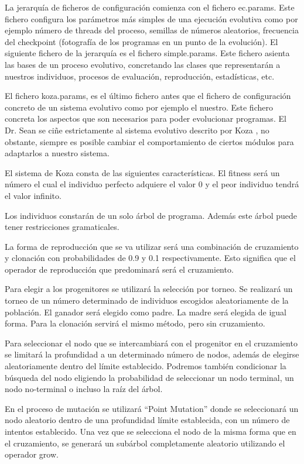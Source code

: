 La jerarquía de ficheros de configuración comienza con el fichero ec.params. Este
fichero configura los parámetros más simples de una ejecución evolutiva como por
ejemplo número de threads del proceso, semillas de números aleatorios, frecuencia
del checkpoint (fotografía de los programas en un punto de la evolución). El
siguiente fichero de la jerarquía es el fichero simple.params. Este fichero
asienta las bases de un proceso evolutivo, concretando las clases que
representarán a nuestros individuos, procesos de evaluación, reproducción,
estadísticas, etc.

El fichero koza.params, es el último fichero antes que el fichero de
configuración concreto de un sistema evolutivo como por ejemplo el nuestro. Este
fichero concreta los aspectos que son necesarios para poder evolucionar
programas. El Dr. Sean se ciñe estrictamente al sistema evolutivo descrito por
Koza \cite{Koza:1992}, no obstante, siempre es posible cambiar el
comportamiento de ciertos módulos para adaptarlos a nuestro sistema.

El sistema de Koza consta de las siguientes características. El fitness será un
número el cual el individuo perfecto adquiere el valor 0 y el peor individuo
tendrá el valor infinito.

Los individuos constarán de un solo árbol de programa. Además este árbol puede
tener restricciones gramaticales.

La forma de reproducción que se va utilizar será una combinación de cruzamiento y
clonación con probabilidades de 0.9 y 0.1 respectivamente. Esto significa que el
operador de reproducción que predominará será el cruzamiento.

Para elegir a los progenitores se utilizará la selección por torneo. Se realizará
un torneo de un número determinado de individuos escogidos aleatoriamente de la
población. El ganador será elegido como padre. La madre será elegida de igual
forma. Para la clonación servirá el mismo método, pero sin cruzamiento.

Para seleccionar el nodo que se intercambiará con el progenitor en el cruzamiento
se limitará la profundidad a un determinado número de nodos, además de elegirse
aleatoriamente dentro del límite establecido. Podremos también condicionar la
búsqueda del nodo eligiendo la probabilidad de seleccionar un nodo terminal, un
nodo no-terminal o incluso la raíz del árbol.

En el proceso de mutación se utilizará “Point Mutation” donde se seleccionará un
nodo aleatorio dentro de una profundidad límite establecida, con un número de
intentos establecido. Una vez que se selecciona el nodo de la misma forma que en
el cruzamiento, se generará un subárbol completamente aleatorio utilizando el
operador grow.


